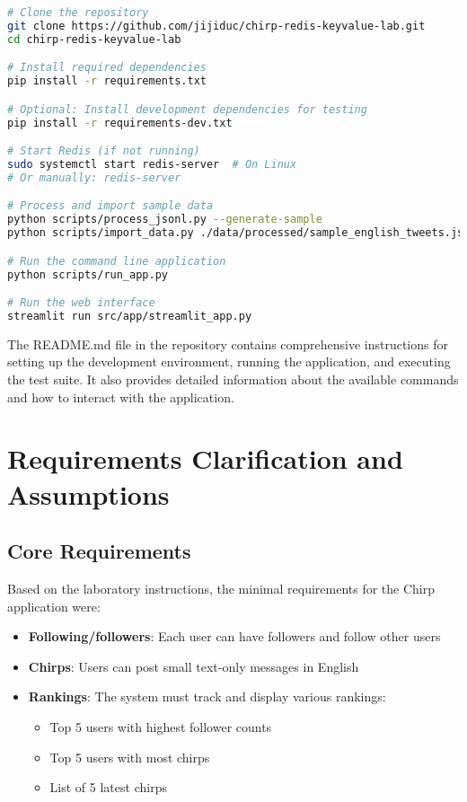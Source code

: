 \documentclass[a4paper,11pt]{article}
\begin{document}
\begin{lstlisting}[language=bash, caption=Installation and setup commands]
# Clone the repository
git clone https://github.com/jijiduc/chirp-redis-keyvalue-lab.git
cd chirp-redis-keyvalue-lab

# Install required dependencies
pip install -r requirements.txt

# Optional: Install development dependencies for testing
pip install -r requirements-dev.txt

# Start Redis (if not running)
sudo systemctl start redis-server  # On Linux
# Or manually: redis-server

# Process and import sample data
python scripts/process_jsonl.py --generate-sample
python scripts/import_data.py ./data/processed/sample_english_tweets.json --add-engagement

# Run the command line application
python scripts/run_app.py

# Run the web interface
streamlit run src/app/streamlit_app.py
\end{lstlisting}

The README.md file in the repository contains comprehensive instructions for setting up the development environment, running the application, and executing the test suite. It also provides detailed information about the available commands and how to interact with the application.

\newpage
\section{Requirements Clarification and Assumptions}

\subsection{Core Requirements}
Based on the laboratory instructions, the minimal requirements for the Chirp application were:

\begin{itemize}
    \item \textbf{Following/followers}: Each user can have followers and follow other users
    \item \textbf{Chirps}: Users can post small text-only messages in English
    \item \textbf{Rankings}: The system must track and display various rankings:
    \begin{itemize}
        \item Top 5 users with highest follower counts
        \item Top 5 users with most chirps
        \item List of 5 latest chirps
    \end{itemize}
\end{itemize}
\end{document}
